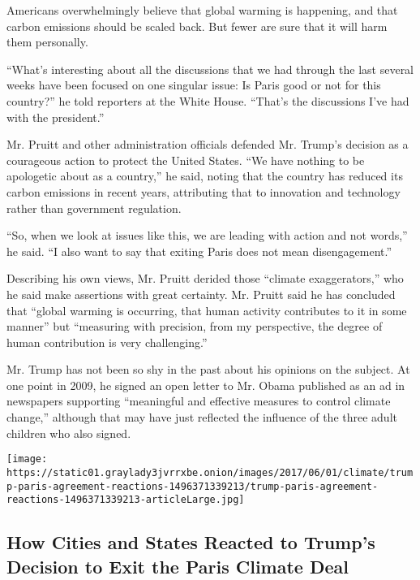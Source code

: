 Americans overwhelmingly believe that global warming is happening, and
that carbon emissions should be scaled back. But fewer are sure that it
will harm them personally.

``What's interesting about all the discussions that we had through the
last several weeks have been focused on one singular issue: Is Paris
good or not for this country?'' he told reporters at the White House.
``That's the discussions I've had with the president.''

Mr. Pruitt and other administration officials defended Mr. Trump's
decision as a courageous action to protect the United States. ``We have
nothing to be apologetic about as a country,'' he said, noting that the
country has reduced its carbon emissions in recent years, attributing
that to innovation and technology rather than government regulation.

``So, when we look at issues like this, we are leading with action and
not words,'' he said. ``I also want to say that exiting Paris does not
mean disengagement.''

Describing his own views, Mr. Pruitt derided those ``climate
exaggerators,'' who he said make assertions with great certainty. Mr.
Pruitt said he has concluded that ``global warming is occurring, that
human activity contributes to it in some manner'' but ``measuring with
precision, from my perspective, the degree of human contribution is very
challenging.''

Mr. Trump has not been so shy in the past about his opinions on the
subject. At one point in 2009, he signed an open letter to Mr. Obama
published as an ad in newspapers supporting ``meaningful and effective
measures to control climate change,'' although that may have just
reflected the influence of the three adult children who also signed.

\href{https://www.nytimes3xbfgragh.onion/interactive/2017/06/02/climate/trump-paris-mayors.html}{}

\texttt{[image: https://static01.graylady3jvrrxbe.onion/images/2017/06/01/climate/trump-paris-agreement-reactions-1496371339213/trump-paris-agreement-reactions-1496371339213-articleLarge.jpg]}

\hypertarget{how-cities-and-states-reacted-to-trumps-decision-to-exit-the-paris-climate-deal}{%
\subsection{How Cities and States Reacted to Trump's Decision to Exit
the Paris Climate
Deal}\label{how-cities-and-states-reacted-to-trumps-decision-to-exit-the-paris-climate-deal}}

